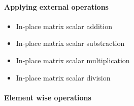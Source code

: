 \paragraph{Applying external operations}
\begin{itemize}
  \item {}
  \sshortdescribe In-place matrix scalar addition  

\item {}
  \sshortdescribe In-place matrix scalar substraction  

\item {}
  \sshortdescribe In-place matrix scalar multiplication  

\item {}
  \sshortdescribe In-place matrix scalar division  

\end{itemize}

\paragraph{Element wise operations}

